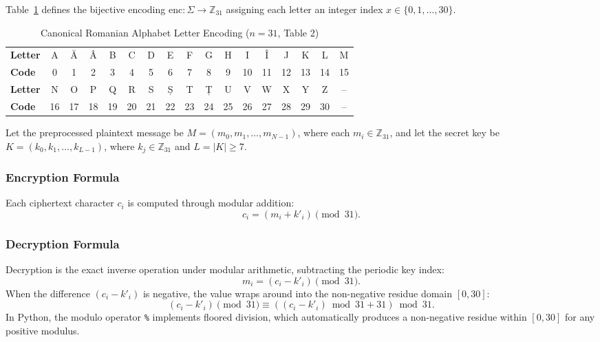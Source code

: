 \documentclass{labreport}
\begin{document}
Table~\ref{tab:romanian_alphabet} defines the bijective encoding $\text{enc}: \Sigma \to \mathbb{Z}_{31}$ assigning each letter an integer index $x \in \{0, 1, \dots, 30\}$.

\begin{table}[H]
\centering
\small
\setlength{\tabcolsep}{4pt}
\caption{Canonical Romanian Alphabet Letter Encoding ($n = 31$, Table 2)}
\label{tab:romanian_alphabet}
\begin{tabular}{@{}l*{16}{c}@{}}
\toprule
\textbf{Letter} & A & Ă & Â & B & C & D & E & F & G & H & I & Î & J & K & L & M \\
\textbf{Code}   & 0 & 1 & 2 & 3 & 4 & 5 & 6 & 7 & 8 & 9 & 10 & 11 & 12 & 13 & 14 & 15 \\
\midrule
\textbf{Letter} & N & O & P & Q & R & S & Ș & T & Ț & U & V & W & X & Y & Z & -- \\
\textbf{Code}   & 16 & 17 & 18 & 19 & 20 & 21 & 22 & 23 & 24 & 25 & 26 & 27 & 28 & 29 & 30 & -- \\
\bottomrule
\end{tabular}
\end{table}

Let the preprocessed plaintext message be $M = (m_0, m_1, \dots, m_{N-1})$, where each $m_i \in \mathbb{Z}_{31}$, and let the secret key be $K = (k_0, k_1, \dots, k_{L-1})$, where $k_j \in \mathbb{Z}_{31}$ and $L = |K| \ge 7$.

\subsubsection{Encryption Formula}
Each ciphertext character $c_i$ is computed through modular addition:
\begin{equation}
    c_i = (m_i + k'_i) \pmod{31}.
\end{equation}

\subsubsection{Decryption Formula}
Decryption is the exact inverse operation under modular arithmetic, subtracting the periodic key index:
\begin{equation}
    m_i = (c_i - k'_i) \pmod{31}.
\end{equation}
When the difference $(c_i - k'_i)$ is negative, the value wraps around into the non-negative residue domain $[0, 30]$:
\begin{equation}
    (c_i - k'_i) \pmod{31} \equiv ((c_i - k'_i) \bmod 31 + 31) \bmod 31.
\end{equation}
In Python, the modulo operator \texttt{\%} implements floored division, which automatically produces a non-negative residue within $[0, 30]$ for any positive modulus.
\end{document}
